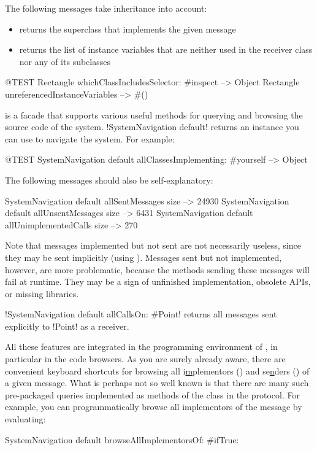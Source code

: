 \documentclass[a4paper,10pt,twoside]{book}
\begin{document}
The following messages take inheritance into account:
\begin{itemize}
\item {} returns the superclass that implements the given message
\item {} returns the list of instance variables that are neither used in the receiver class nor any of its subclasses
\end{itemize}

\begin{code}{@TEST}
Rectangle whichClassIncludesSelector: #inspect --> Object
Rectangle unreferencedInstanceVariables            --> #()
\end{code}

 is a facade that supports various useful methods for querying and browsing the source code of the system.
\ct!SystemNavigation default! returns an instance you can use to navigate the system.
For example:

\begin{code}{@TEST}
SystemNavigation default allClassesImplementing: #yourself --> {Object}
\end{code}

The following messages should also be self-explanatory:

\begin{code}{}
SystemNavigation default allSentMessages size          --> 24930
SystemNavigation default allUnsentMessages size      --> 6431
SystemNavigation default allUnimplementedCalls size --> 270
\end{code}

Note that messages implemented but not sent are not necessarily useless, since they may be sent implicitly (\eg using ).
Messages sent but not implemented, however, are more problematic, because the methods sending these messages will fail at runtime.
They may be a sign of unfinished implementation, obsolete APIs, or missing libraries.

\ct!SystemNavigation default allCallsOn: #Point! returns all messages sent explicitly to \ct!Point! as a receiver.

All these features are integrated in the programming environment of \pharo, in particular in the code browsers.
As you are surely already aware, there are convenient keyboard shortcuts for browsing all i\underline{m}plementors () and se\underline{n}ders () of a given message.
What is perhaps not so well known is that there are many such pre-packaged queries implemented as methods of the  class in the  protocol.
For example, you can programmatically browse all implementors of the message  by evaluating:
\begin{code}{}
SystemNavigation default browseAllImplementorsOf: #ifTrue:
\end{code}
\end{document}
